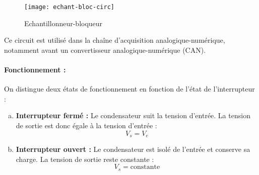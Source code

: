 \begin{figure}[H]
    \centering
    \texttt{[image: echant-bloc-circ]}
    \caption{Echantillonneur-bloqueur}
    \label{fig:echantillonneur}
\end{figure}

Ce circuit est utilisé dans la chaîne d'acquisition analogique-numérique, notamment avant un convertisseur analogique-numérique (CAN).

\paragraph{Fonctionnement :}
On distingue deux états de fonctionnement en fonction de l'état de l'interrupteur :

\begin{enumerate}[(a)]
    \item \textbf{Interrupteur fermé :} Le condensateur suit la tension d'entrée. La tension de sortie est donc égale à la tension d'entrée :\\
    \[
        V_s = V_e
    \]
    
    \item \textbf{Interrupteur ouvert :} Le condensateur est isolé de l'entrée et conserve sa charge. La tension de sortie reste constante :\\
    \[
        V_s = \text{constante}
    \]
\end{enumerate}